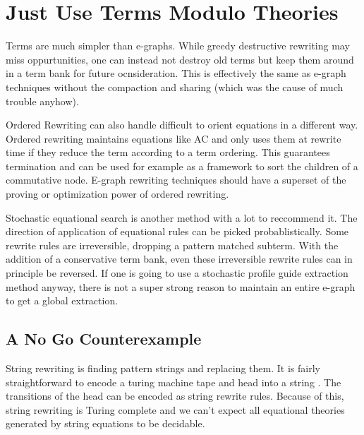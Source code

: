 \section{Just Use Terms Modulo Theories}

Terms are much simpler than e-graphs. While greedy destructive rewriting may miss oppurtunities, one can instead not destroy old terms but keep them around in a term bank for future ocnsideration. This is effectively the same as e-graph techniques without the compaction and sharing (which was the cause of much trouble anyhow). %

Ordered Rewriting can also handle difficult to orient equations in a different way. Ordered rewriting maintains equations like AC and only uses them at rewrite time if they reduce the term according to a term ordering. This guarantees termination and can be used for example as a framework to sort the children of a commutative node. E-graph rewriting techniques should have a superset of the proving or optimization power of ordered rewriting.

Stochastic equational search is another method with a lot to reccommend it. The direction of application of equational rules can be picked probablistically. Some rewrite rules are irreversible, dropping a pattern matched subterm. With the addition of a conservative term bank, even these irreversible rewrite rules can in principle be reversed. If one is going to use a stochastic profile guide extraction method anyway, there is not a super strong reason to maintain an entire e-graph to get a global extraction.





\subsection{A No Go Counterexample}

String rewriting is finding pattern strings and replacing them. It is fairly straightforward to encode a turing machine tape and head into a string \cite{traatbook}.
The transitions of the head can be encoded as string rewrite rules. Because of this, string rewriting is Turing complete and we can't expect all
equational theories generated by string equations to be decidable.

